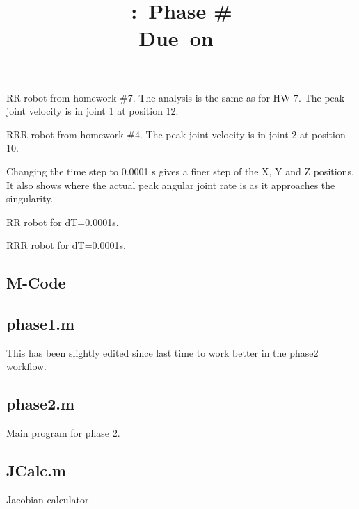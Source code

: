 \documentclass{report}
\title{\vspace{2in}\textmd{\textbf{\hmwkClass:\ Phase \#\hmwkNumber}}\\\normalsize\vspace{0.1in}\small{Due\ on\ \hmwkDueDate}}
\date{}
\author{\textbf{\hmwkAuthorName}}
\begin{document}
\begin{spacing}{1.1}
\maketitle
\newpage


\clearpage

RR robot from homework \#7. The analysis is the same as for HW 7. The peak joint velocity is in joint 1 at position 12.


\newpage
RRR robot from homework \#4. The peak joint velocity is in joint 2 at position 10.



\newpage
Changing the time step to 0.0001 s gives a finer step of the X, Y and Z positions. It also shows where the actual peak angular joint rate is as it approaches the singularity.

RR robot for dT=0.0001s.


RRR robot for dT=0.0001s.


\newpage
\begin{appendices}
\section{M-Code}
\subsection{phase1.m}
This has been slightly edited since last time to work better in the phase2 workflow.


\subsection{phase2.m}
Main program for phase 2.


\subsection{JCalc.m}
Jacobian calculator.



\end{appendices}
\end{spacing}
\end{document}
